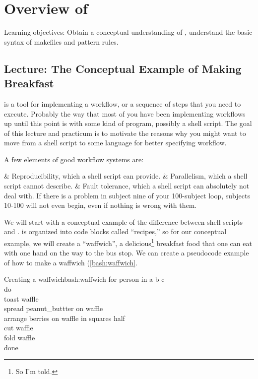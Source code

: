 \renewcommand{\chaptername}{Practical}
\chapter{Overview of \maken{}}
Learning objectives: Obtain a conceptual understanding of \maken{}, understand the basic syntax of makefiles and pattern rules.
\label{sec:practicum1}
\section{Lecture: The Conceptual Example of Making Breakfast}

\maken{} is a tool for implementing a workflow, or a sequence of steps that you need to execute. Probably the way that most of you have been implementing workflows up until this point is with some kind of program, possibly a shell script. The goal of this lecture and practicum is to motivate the reasons why you might want to move from a shell script to some language for better specifying workflow.

A few elements of good workflow systems are:
\begin{easylist}[itemize]
	& Reproducibility, which a shell script can provide.
	& Parallelism, which a shell script cannot describe.
	& Fault tolerance, which a shell script can absolutely not deal with. If there is a problem in subject nine of your 100-subject loop, subjects 10-100 will not even begin, even if nothing is wrong with them.
\end{easylist}

We will start with a conceptual example of the difference between shell scripts and \maken{}. \maken{} is organized into code blocks called ``recipes,'' so for our conceptual example, we will create a ``waffwich'', a delicious\footnote{So I'm told.} breakfast food that one can eat with one hand on the way to the bus stop. We can create a pseudocode   example of how to make a waffwich (\autoref{bash:waffwich}.
\begin{bash}{Creating a waffwich}{bash:waffwich}
	for person in a b c \\
	do \\
	toast waffle \\
	spread peanut_buttter \dd on waffle \\
	arrange berries \dd on waffle \dd in squares \dd half \\
	cut waffle \\ 
	fold waffle \\
	done
\end{bash}

